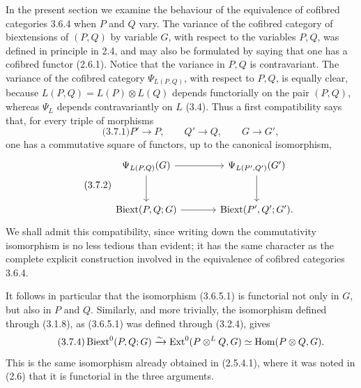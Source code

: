 \documentclass[11pt]{article}
\providecommand{\Hom}{\operatorname{Hom}}
\providecommand{\Ext}{\operatorname{Ext}}
\begin{document}
In the present section we examine the behaviour of the equivalence of cofibred categories 3.6.4 when \(P\) and \(Q\) vary.  The variance of the cofibred category of biextensions of \((P,Q)\) by variable \(G\), with respect to the variables \(P,Q\), was defined in principle in 2.4, and may also be formulated by saying that one has a cofibred functor (2.6.1).  Notice that the variance in \(P,Q\) is contravariant.  The variance of the cofibred category \(\Psi_{L(P,Q)}\), with respect to \(P,Q\), is equally clear, because \(L(P,Q)=L(P)\otimes L(Q)\) depends functorially on the pair \((P,Q)\), whereas \(\Psi_L\) depends contravariantly on \(L\) (3.4).  Thus a first compatibility says that, for every triple of morphisms
\begin{equation}\qquad\text{(3.7.1)}
        P'\longrightarrow P,
        \qquad Q'\longrightarrow Q,
        \qquad G\longrightarrow G',
\end{equation}
one has a commutative square of functors, up to the canonical isomorphism,
\begin{equation}\qquad\text{(3.7.2)}
\begin{tikzcd}[column sep=large,row sep=large]
 \Psi_{L(P,Q)}(G) \arrow[r] \arrow[d] & \Psi_{L(P',Q')}(G') \arrow[d] \\
 \Biext(P,Q;G) \arrow[r] & \Biext(P',Q';G').
\end{tikzcd}
\end{equation}
We shall admit this compatibility, since writing down the commutativity isomorphism is no less tedious than evident; it has the same character as the complete explicit construction involved in the equivalence of cofibred categories 3.6.4.

It follows in particular that the isomorphism (3.6.5.1) is functorial not only in \(G\), but also in \(P\) and \(Q\).  Similarly, and more trivially, the isomorphism defined through (3.1.8), as (3.6.5.1) was defined through (3.2.4), gives
\begin{equation}\qquad\text{(3.7.4)}
 \Biext^0(P,Q;G)\xrightarrow{\sim}
 \Ext^0(P\otimes^L Q,G)\simeq \Hom(P\otimes Q,G).
\end{equation}
This is the same isomorphism already obtained in (2.5.4.1), where it was noted in (2.6) that it is functorial in the three arguments.
\end{document}
